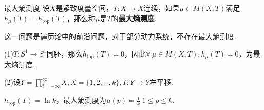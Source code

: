 \begin{definition}{最大熵测度}
    设$X$是紧致度量空间，$T:X\to X$连续，如果$\mu\in M(X,T)$满足$h_\mu(T)=h_\mathrm{top}(T)$，那么称$\mu$是$T$的\textbf{最大熵测度}.
\end{definition}
这一问题是遍历论中的前沿问题，对于部分动力系统，不存在最大熵测度.\par
\begin{instance}
    (1)\;$T:S^1\to S^1$同胚，那么$h_\mathrm{top}(T)=0$，因此$\forall\, \mu\in M(X,T),h_\mu(T)=0$，为最大熵测度.\par
    (2)\;设$Y=\prod_{i=-\infty}^\infty{X},X=\{1,2,\cdots,k\},T:Y\to Y$左平移.\par
    $h_\mathrm{top}(T)=\ln{k}$，最大熵测度为$\mu(p)=\frac{1}{k}\;1\leq p\leq k$.
\end{instance}

